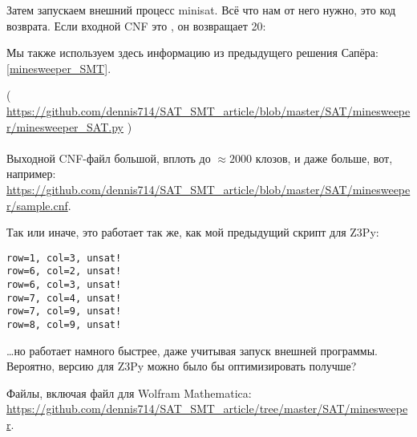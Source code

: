 Затем запускаем внешний процесс minisat.
Всё что нам от него нужно, это код возврата.
Если входной \ac{CNF} это , он возвращает 20:

Мы также используем здесь информацию из предыдущего решения Сапёра: \ref{minesweeper_SMT}.



( \url{https://github.com/dennis714/SAT_SMT_article/blob/master/SAT/minesweeper/minesweeper_SAT.py} ) \\
\\
Выходной \ac{CNF}-файл большой, вплоть до $\approx 2000$ клозов, и даже больше, вот, например: \url{https://github.com/dennis714/SAT_SMT_article/blob/master/SAT/minesweeper/sample.cnf}.

Так или иначе, это работает так же, как мой предыдущий скрипт для Z3Py:

\begin{lstlisting}
row=1, col=3, unsat!
row=6, col=2, unsat!
row=6, col=3, unsat!
row=7, col=4, unsat!
row=7, col=9, unsat!
row=8, col=9, unsat!
\end{lstlisting}

\dots но работает намного быстрее, даже учитывая запуск внешней программы.
Вероятно, версию для Z3Py можно было бы оптимизировать получше?

Файлы, включая файл для Wolfram Mathematica: \url{https://github.com/dennis714/SAT_SMT_article/tree/master/SAT/minesweeper}.

